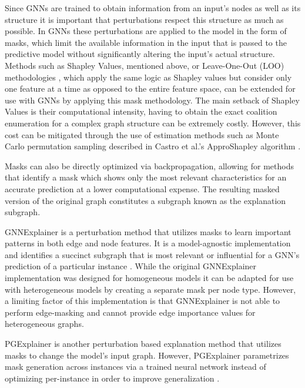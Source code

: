         Since GNNs are trained to obtain information from an input's nodes as well as its structure it is important that perturbations respect this structure as much as possible. In GNNs these perturbations are applied to the model in the form of masks, which limit the available information in the input that is passed to the predictive model without significantly altering the input's actual structure. Methods such as Shapley Values, mentioned above, or Leave-One-Out (LOO) methodologies \cite{limonroejurafsky2017}, which apply the same logic as Shapley values but consider only one feature at a time as opposed to the entire feature space, can be extended for use with GNNs by applying this mask methodology. The main setback of Shapley Values is their computational intensity, having to obtain the exact coalition enumeration for a complex graph structure can be extremely costly. However, this cost can be mitigated through the use of estimation methods such as Monte Carlo permutation sampling described in Castro et al.'s ApproShapley algorithm \cite{castro2009}\cite{lundberg2017}.

        Masks can also be directly optimized via backpropagation, allowing for methods that identify a mask which shows only the most relevant characteristics for an accurate prediction at a lower computational expense. The resulting masked version of the original graph constitutes a subgraph known as the explanation subgraph. 
        
        GNNExplainer is a perturbation method that utilizes masks to learn important patterns in both edge and node features. It is a model-agnostic implementation and identifies a succinct subgraph that is most relevant or influential for a GNN's prediction of a particular instance \cite{ying2019}. While the original GNNExplainer implementation was designed for homogeneous models it can be adapted for use with heterogeneous models by creating a separate mask per node type. However, a limiting factor of this implementation is that GNNExplainer is not able to perform edge-masking and cannot provide edge importance values for heterogeneous graphs. 
        
        PGExplainer is another perturbation based explanation method that utilizes masks to change the model's input graph. However, PGExplainer parametrizes mask generation across instances via a trained neural network instead of optimizing per-instance in order to improve generalization \cite{luo2020}. 
        
